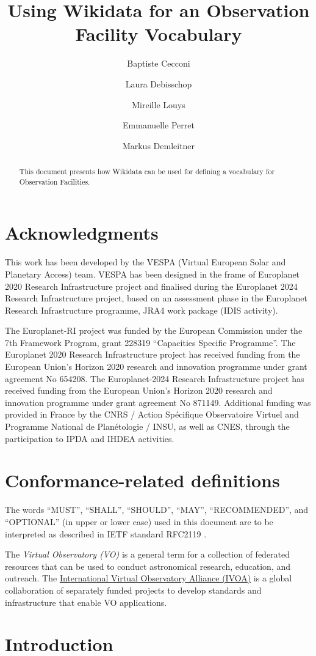 \documentclass[11pt,a4paper]{ivoa}
\title{Using Wikidata for an Observation Facility Vocabulary}
\author[mailto:baptiste.cecconi@obspm.fr]{Baptiste Cecconi}
\author{Laura Debisschop}
\author{Mireille Louys}
\author{Emmanuelle Perret}
\author{Markus Demleitner}
\begin{document}
\begin{abstract}
This document presents how Wikidata can be used for defining a
vocabulary for Observation Facilities.
\end{abstract}


\section*{Acknowledgments}

This work has been developed by the VESPA (Virtual European Solar
and Planetary Access) team.  VESPA has been designed in the frame of
Europlanet 2020 Research Infrastructure project and finalised
during the Europlanet 2024 Research Infrastructure project,
based on an assessment phase in the Europlanet Research Infrastructure
 programme, JRA4 work package (IDIS activity).

The Europlanet-RI project was funded by the European Commission under the
7th Framework Program, grant 228319 ``Capacities Specific Programme''.
The Europlanet 2020 Research Infrastructure project has
received funding from the European Union's Horizon 2020 research and
innovation programme under grant agreement No 654208.  The Europlanet-2024
Research Infrastructure project has received funding from
the European Union's Horizon 2020 research and innovation programme under
grant agreement No 871149.  Additional funding was provided in France by
the CNRS / Action Sp\'ecifique Observatoire Virtuel and Programme National
de Plan\'etologie / INSU, as well as CNES, through the participation to
IPDA and IHDEA activities.

\section*{Conformance-related definitions}

The words ``MUST'', ``SHALL'', ``SHOULD'', ``MAY'', ``RECOMMENDED'', and
``OPTIONAL'' (in upper or lower case) used in this document are to be
interpreted as described in IETF standard RFC2119 \citep{std:RFC2119}.

The \emph{Virtual Observatory (VO)} is a
general term for a collection of federated resources that can be used
to conduct astronomical research, education, and outreach.
The \href{https://www.ivoa.net}{International
Virtual Observatory Alliance (IVOA)} is a global
collaboration of separately funded projects to develop standards and
infrastructure that enable VO applications.


\section{Introduction}
\end{document}
